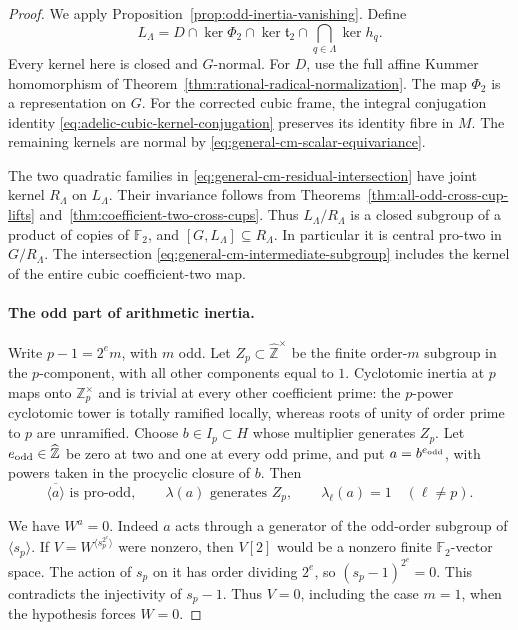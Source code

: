 \begin{proof}
We apply Proposition~\ref{prop:odd-inertia-vanishing}.
Define
\begin{equation}
 L_\Lambda=D\cap\ker\Phi_2\cap\ker\mathfrak t_2
                    \cap\bigcap_{q\in\Lambda}\ker h_q.
 \label{eq:general-cm-intermediate-subgroup}
\end{equation}
Every kernel here is closed and \(G\)-normal.
For \(D\), use the full affine Kummer homomorphism of
Theorem~\ref{thm:rational-radical-normalization}.
The map \(\Phi_2\) is a representation on \(G\).
For the corrected cubic frame, the integral conjugation
identity \eqref{eq:adelic-cubic-kernel-conjugation}
preserves its identity fibre in \(M\).
The remaining kernels are normal by
\eqref{eq:general-cm-scalar-equivariance}.

The two quadratic families in
\eqref{eq:general-cm-residual-intersection} have joint
kernel \(R_\Lambda\) on \(L_\Lambda\).
Their invariance follows from
Theorems~\ref{thm:all-odd-cross-cup-lifts}
and~\ref{thm:coefficient-two-cross-cups}.
Thus \(L_\Lambda/R_\Lambda\) is a closed subgroup of
a product of copies of \(\mathbb F_2\), and
\([G,L_\Lambda]\subseteq R_\Lambda\).
In particular it is central pro-two in \(G/R_\Lambda\).
The intersection \eqref{eq:general-cm-intermediate-subgroup}
includes the kernel of the entire cubic coefficient-two map.

\paragraph{The odd part of arithmetic inertia.}
Write \(p-1=2^e m\), with \(m\) odd.
Let \(Z_p\subset\widehat{\mathbb Z}^{\times}\) be the
finite order-\(m\) subgroup in the \(p\)-component,
with all other components equal to \(1\).
Cyclotomic inertia at \(p\) maps onto
\(\mathbb Z_p^\times\) and is trivial at every other
coefficient prime: the \(p\)-power cyclotomic tower
is totally ramified locally, whereas roots of unity
of order prime to \(p\) are unramified.
Choose \(b\in I_p\subset H\) whose multiplier generates
\(Z_p\).
Let \(e_{\rm odd}\in\widehat{\mathbb Z}\) be zero at
two and one at every odd prime, and put
\(a=b^{e_{\rm odd}}\), with powers taken in the
procyclic closure of \(b\).
Then
\[
 \overline{\langle a\rangle}\text{ is pro-odd},\qquad
 \lambda(a)\text{ generates }Z_p,\qquad
 \lambda_\ell(a)=1\quad(\ell\ne p).
\]

We have \(W^a=0\).
Indeed \(a\) acts through a generator of the odd-order
subgroup of \(\langle s_p\rangle\).
If \(V=W^{\langle s_p^{2^e}\rangle}\) were nonzero,
then \(V[2]\) would be a nonzero finite
\(\mathbb F_2\)-vector space.
The action of \(s_p\) on it has order dividing \(2^e\),
so \((s_p-1)^{2^e}=0\).
This contradicts the injectivity of \(s_p-1\).
Thus \(V=0\), including the case \(m=1\), when the
hypothesis forces \(W=0\).


\end{proof}
